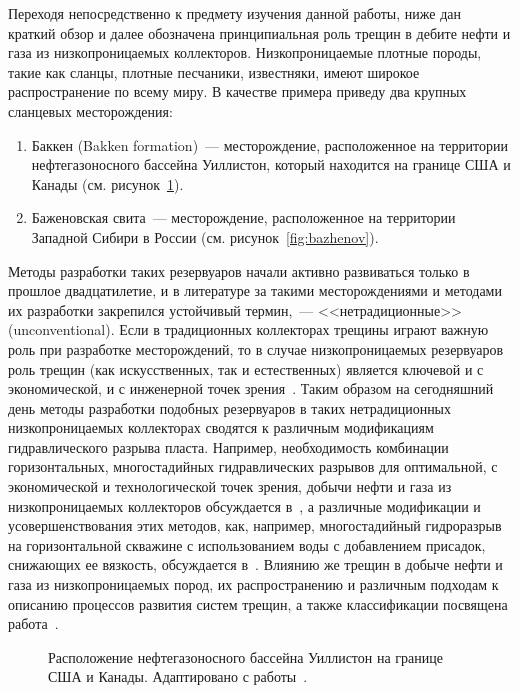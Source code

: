 Переходя непосредственно к предмету изучения данной работы, ниже дан краткий обзор и далее обозначена принципиальная роль трещин в дебите нефти и газа из низкопроницаемых коллекторов. Низкопроницаемые плотные породы, такие как сланцы, плотные песчаники, известняки, имеют широкое распространение по всему миру. В качестве примера приведу два крупных сланцевых месторождения:
\begin{enumerate}
  \item Баккен (Bakken formation)~--- месторождение, расположенное на территории нефтегазоносного бассейна Уиллистон, который находится на границе США и Канады (см. рисунок~\ref{fig:bakken}).
  \item Баженовская свита~--- месторождение, расположенное на территории Западной Сибири в России (см. рисунок~\ref{fig:bazhenov}).
\end{enumerate}
Методы разработки таких резервуаров начали активно развиваться только в прошлое двадцатилетие, и в литературе за такими месторождениями и методами их разработки закрепился устойчивый термин,~--- <<нетрадиционные>> (unconventional). Если в традиционных коллекторах трещины играют важную роль при разработке месторождений, то в случае низкопроницаемых резервуаров роль трещин (как искусственных, так и естественных) является ключевой и с экономической, и с инженерной точек зрения~\autocite{warpinski2009stimulating, ye2016fracture}. Таким образом на сегодняшний день методы разработки подобных резервуаров в таких нетрадиционных низкопроницаемых коллекторах сводятся к различным модификациям гидравлического разрыва пласта. Например, необходимость комбинации горизонтальных, многостадийных гидравлических разрывов для оптимальной, с экономической и технологической точек зрения, добычи нефти и газа из низкопроницаемых коллекторов обсуждается в~\autocite{warpinski2009stimulating, ye2016fracture}, а различные модификации и усовершенствования этих методов, как, например, многостадийный гидроразрыв на горизонтальной скважине с использованием воды с добавлением присадок, снижающих ее вязкость, обсуждается в~\autocite{barati2014review}. Влиянию же трещин в добыче нефти и газа из низкопроницаемых пород, их распространению и различным подходам к описанию процессов развития систем трещин, а также классификации посвящена работа~\autocite{olson2004}.

\begin{figure}[ht]
  \caption{Расположение нефтегазоносного бассейна Уиллистон на границе США и Канады. Адаптировано с работы~\autocite{kuhn2012three}.}
  \label{fig:bakken}
\end{figure}

